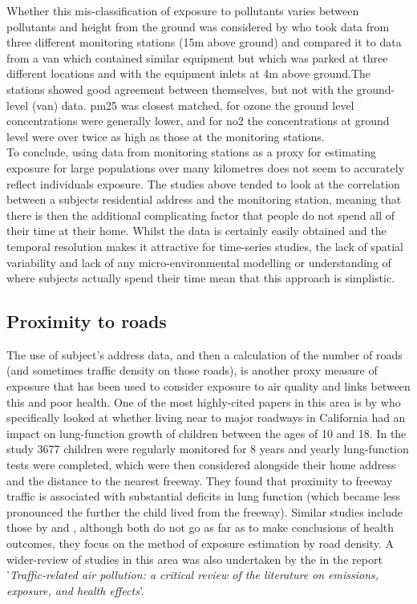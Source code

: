 Whether this mis-classification of exposure to pollutants varies between pollutants and height from the ground was considered by \cite{Restrepo2004} who took data from three different monitoring stations (15m above ground) and compared it to data from a van which contained similar equipment but which was parked at three different locations and with the equipment inlets at 4m above ground.The stations showed good agreement between themselves, but not with the ground-level (van) data. \gls{pm25} was closest matched, for ozone the ground level concentrations were generally lower, and for \gls{no2} the concentrations at ground level were over twice as high as those at the monitoring stations.\\ 

To conclude, using data from monitoring stations as a proxy for estimating exposure for large populations over many kilometres does not seem to accurately reflect individuals exposure. The studies above tended to look at the correlation between a subjects residential address and the monitoring station, meaning that there is then the additional complicating factor that people do not spend all of their time at their home. Whilst the data is certainly easily obtained and the temporal resolution makes it attractive for time-series studies, the lack of spatial variability and lack of any micro-environmental modelling or understanding of where subjects actually spend their time mean that this approach is simplistic.

\subsection{Proximity to roads}
\label{subsec:proximitytoroads}

The use of subject's address data, and then a calculation of the number of roads (and sometimes traffic density on those roads), is another proxy measure of exposure that has been used to consider exposure to air quality and links between this and poor health. One of the most highly-cited papers in this area is by \cite{Gauderman2007}  who specifically looked at whether living near to major roadways in California had an impact on lung-function growth of children between the ages of 10 and 18. In the study 3677 children were regularly monitored for 8 years and yearly lung-function tests were completed, which were then considered alongside their home address and the distance to the nearest freeway. They found that proximity to freeway traffic is associated with substantial deficits in lung function (which became less pronounced the further the child lived from the freeway). Similar studies include those by \cite{Janssen2001} and \cite{Rose2009}, although both do not go as far as to make conclusions of health outcomes, they focus on the method of exposure estimation by road density. A wider-review of studies in this area was also undertaken by the \cite{HPotHEoT-RA2010} in the report '\textit{Traffic-related air pollution: a critical review of the literature on emissions, exposure, and health effects}'.

